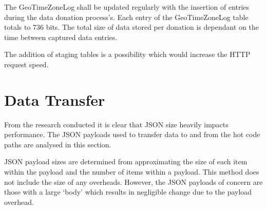 \documentclass[a4paper,open right,12pt]{report}
\begin{document}
The GeoTimeZoneLog shall be updated regularly with the insertion of entries during the data donation process's. Each entry of the GeoTimeZoneLog table totals to 736 bits. The total size of data stored per donation is dependant on the time between captured data entries.


The addition of staging tables is a possibility which would increase the HTTP request speed.

\chapter{Data Transfer}
From the research conducted it is clear that JSON size heavily impacts performance. The JSON payloads used to transfer data to and from the hot code paths are analysed in this section.

JSON payload sizes are determined from approximating the size of each item within the payload and the number of items within a payload.\cite{ByteSizeMatters} This method does not include the size of any overheads. However, the JSON payloads of concern are those with a large ‘body’ which results in negligible change due to the payload overhead.
\end{document}
